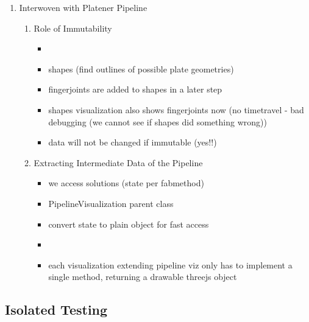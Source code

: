 \documentclass[../ClassicThesis.tex]{subfiles}
\begin{document}
\begin{enumerate}
\item Interwoven with Platener Pipeline
  \begin{enumerate}
  \item Role of Immutability
    \begin{itemize}
    \item {}
    \item shapes (find outlines of possible plate geometries)
    \item fingerjoints are added to shapes in a later step
    \item shapes visualization also shows fingerjoints now (no timetravel - bad
      debugging (we cannot see if shapes did something wrong))
    \item data will not be changed if immutable (yes!!)
    \end{itemize}

  \item Extracting Intermediate Data of the Pipeline
    \begin{itemize}
    \item we access solutions (state per fabmethod)
    \item PipelineVisualization parent class
    \item convert state to plain object for fast access
    \item {}
    \item each visualization extending pipeline viz only has to implement a
      single method, returning a drawable threejs object
    \end{itemize}
  \end{enumerate}
\end{enumerate}

\subsection{Isolated Testing}
\end{document}
